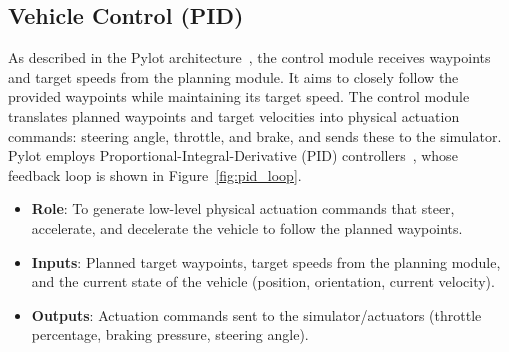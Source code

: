 \documentclass[11pt,a4paper]{report}
\begin{document}
\subsection{Vehicle Control (PID)}
As described in the Pylot architecture~\cite{erdos_pylot}, the control module receives waypoints and target speeds from the planning module. It aims to closely follow the provided waypoints while maintaining its target speed. The control module translates planned waypoints and target velocities into physical actuation commands: steering angle, throttle, and brake, and sends these to the simulator. Pylot employs Proportional-Integral-Derivative (PID) controllers~\cite{pid_control}, whose feedback loop is shown in Figure~\ref{fig:pid_loop}.
\begin{itemize}
    \item \textbf{Role}: To generate low-level physical actuation commands that steer, accelerate, and decelerate the vehicle to follow the planned waypoints.
    \item \textbf{Inputs}: Planned target waypoints, target speeds from the planning module, and the current state of the vehicle (position, orientation, current velocity).
    \item \textbf{Outputs}: Actuation commands sent to the simulator/actuators (throttle percentage, braking pressure, steering angle).
\end{itemize}
\end{document}
